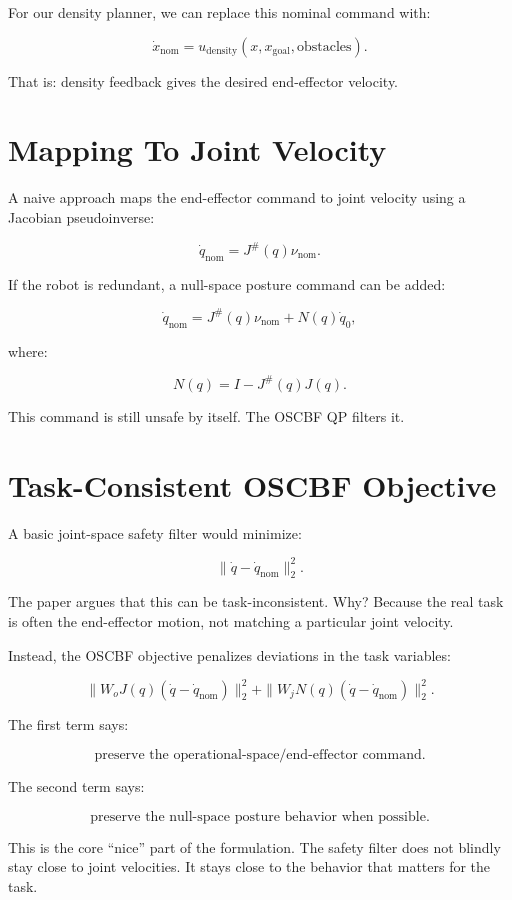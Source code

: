 \documentclass[11pt]{article}
\begin{document}
For our density planner, we can replace this nominal command with:

\[
\dot{x}_{\mathrm{nom}}
= u_{\mathrm{density}}(x, x_{\mathrm{goal}}, \text{obstacles}).
\]

That is: density feedback gives the desired end-effector velocity.

\section{Mapping To Joint Velocity}

A naive approach maps the end-effector command to joint velocity using a
Jacobian pseudoinverse:

\[
\dot{q}_{\mathrm{nom}}
= J^\#(q)\nu_{\mathrm{nom}}.
\]

If the robot is redundant, a null-space posture command can be added:

\[
\dot{q}_{\mathrm{nom}}
= J^\#(q)\nu_{\mathrm{nom}}
+ N(q)\dot{q}_0,
\]

where:

\[
N(q) = I - J^\#(q)J(q).
\]

This command is still unsafe by itself. The OSCBF QP filters it.

\section{Task-Consistent OSCBF Objective}

A basic joint-space safety filter would minimize:

\[
\|\dot{q} - \dot{q}_{\mathrm{nom}}\|_2^2.
\]

The paper argues that this can be task-inconsistent. Why? Because the real task
is often the end-effector motion, not matching a particular joint velocity.

Instead, the OSCBF objective penalizes deviations in the task variables:

\[
\|W_o J(q)(\dot{q} - \dot{q}_{\mathrm{nom}})\|_2^2
+
\|W_j N(q)(\dot{q} - \dot{q}_{\mathrm{nom}})\|_2^2.
\]

The first term says:

\[
\text{preserve the operational-space/end-effector command}.
\]

The second term says:

\[
\text{preserve the null-space posture behavior when possible}.
\]

This is the core ``nice'' part of the formulation. The safety filter does not
blindly stay close to joint velocities. It stays close to the behavior that
matters for the task.
\end{document}
